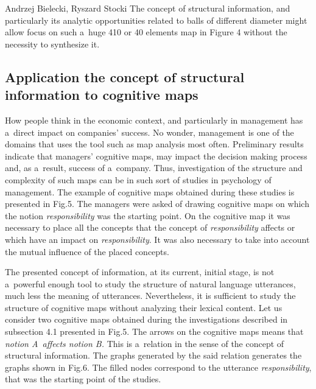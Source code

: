 \begin{artengenv2auth}{Andrzej Bielecki, Ryszard Stocki}
The concept of structural information, and particularly its analytic opportunities related to balls of different diameter might allow focus on such a~huge 410 
\parencite[][]{iasiello_whats_2023} %
 or 40 elements map in Figure 4 without the necessity to synthesize it.



\subsection{Application the concept of structural information to cognitive maps}



How people think in the economic context, and particularly in management has a~direct impact on companies' success. No wonder, management is one of the domains that uses the tool such as map analysis most often. Preliminary results indicate that managers' cognitive maps, may impact the decision making process and, as a~result, success of a~company. Thus, investigation of the structure and complexity of such maps can be in such sort of studies in psychology of management. The example of cognitive maps obtained during these studies is presented in Fig.5. The managers were asked of drawing cognitive maps on which the notion \textit{responsibility} was the starting point. On the cognitive map it was necessary to place all the concepts that the concept of \textit{responsibility} affects or which have an impact on \textit{responsibility}. It was also necessary to take into account the mutual influence of the placed concepts.



The presented concept of information, at its current, initial stage, is not a~powerful enough tool to study the structure of natural language utterances, much less the meaning of utterances. Nevertheless, it is sufficient to study the structure of cognitive maps without analyzing their lexical content. Let us consider two cognitive maps obtained during the investigations described in subsection 4.1 presented in Fig.5. The arrows on the cognitive maps means that \textit{notion A~affects notion B.} This is a~relation in the sense of the concept of structural information. The graphs generated by the said relation generates the graphs shown in Fig.6. The filled nodes correspond to the utterance \textit{responsibility}, that was the starting point of the studies.

\begin{figure}[h]
\begin{adjustwidth}{-.1\textwidth}{}
  \begin{minipage}{.5\linewidth}
    \centering
  \begin{tikzpicture}[scale=0.6, transform shape,
   centernode/.style={ellipse, align=center, minimum width=2cm},
        mynode/.style={draw, align=center, rounded corners, minimum width=1cm, minimum height=0.5cm},
        myarrow/.style={<-, >=latex, thick},
        node distance=1cm and 2cm
    ]
    

\end{tikzpicture}
\end{minipage}
\end{adjustwidth}
\end{figure}
\end{artengenv2auth}
